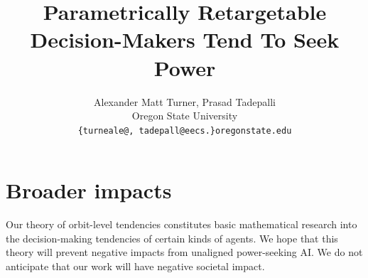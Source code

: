 \documentclass{article}
\title{Parametrically Retargetable Decision-Makers Tend To Seek Power}
\author{
Alexander Matt Turner, Prasad Tadepalli\\
Oregon State University\\
\texttt{\{turneale@, tadepall@eecs.\}oregonstate.edu} 
}
\begin{document}
\maketitle 






\section*{Broader impacts}
Our theory of orbit-level tendencies constitutes basic mathematical research into the decision-making tendencies of certain kinds of agents. We hope that this theory will prevent negative impacts from unaligned power-seeking AI. We do not anticipate that our work will have negative societal impact.


{\small}


\newpage 

\appendix




\end{document}
